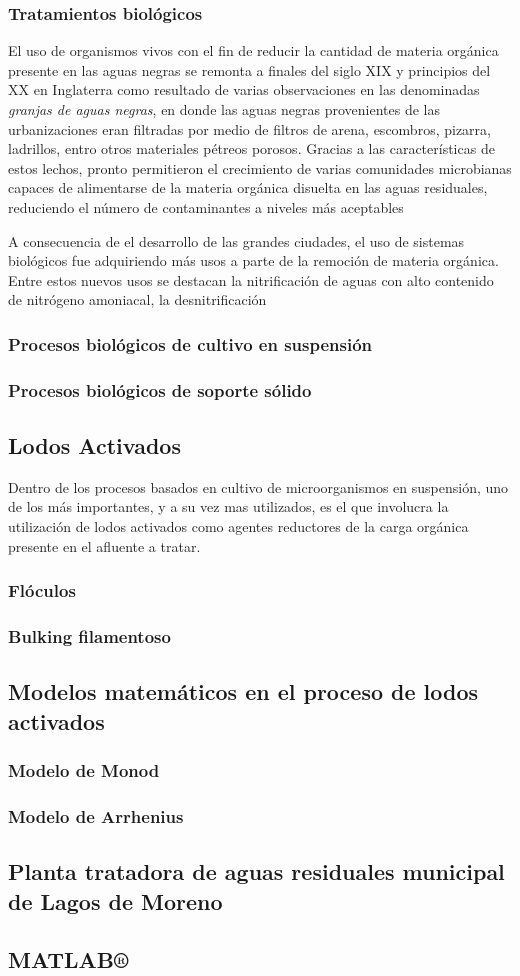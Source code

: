 \subsubsection{Tratamientos biológicos}
El uso de organismos vivos con el fin de reducir la cantidad de materia orgánica presente en las aguas negras se remonta a finales del siglo XIX y principios del XX en Inglaterra como resultado de varias observaciones en las denominadas \emph{granjas de aguas negras}, en donde las aguas negras provenientes de las urbanizaciones eran filtradas por medio de filtros de arena, escombros, pizarra, ladrillos, entro otros materiales pétreos porosos. Gracias a las características de estos lechos, pronto permitieron el crecimiento de varias comunidades microbianas capaces de alimentarse de la materia orgánica disuelta en las aguas residuales, reduciendo el número de contaminantes a niveles más aceptables~\citep{Fair2008}\par
A consecuencia de el desarrollo de las grandes ciudades, el uso de sistemas biológicos fue adquiriendo más usos a parte de la remoción de materia orgánica. Entre estos nuevos usos se destacan la nitrificación de aguas con alto contenido de nitrógeno amoniacal, la desnitrificación 
\subsubsection{Procesos biológicos de cultivo en suspensión}
\subsubsection{Procesos biológicos de soporte sólido}
\subsection{Lodos Activados}
Dentro de los procesos basados en cultivo de microorganismos en suspensión, uno de los más importantes, y a su vez mas utilizados, es el que involucra la utilización de lodos activados como agentes reductores de la carga orgánica presente en el afluente a tratar.
\subsubsection{Flóculos}
\subsubsection{Bulking filamentoso}
\subsection{Modelos matemáticos en el proceso de lodos activados}
\subsubsection{Modelo de Monod}
\subsubsection{Modelo de Arrhenius}
\subsection{Planta tratadora de aguas residuales municipal de Lagos de Moreno}
\subsection{MATLAB®}
